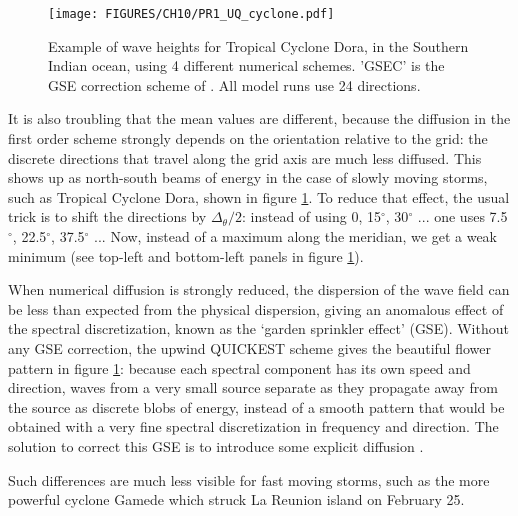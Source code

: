 \begin{figure}[htb]
\centerline{\texttt{[image: FIGURES/CH10/PR1\_UQ\_cyclone.pdf]}}
\caption{Example of wave heights for Tropical Cyclone Dora, in the Southern Indian ocean, using 4 different numerical schemes. 
'GSEC' is the GSE correction scheme of 
\cite{Tolman2002a}. All model runs use 24 directions. }
\label{fig:PR1_UQ_space}
\end{figure}
It is also troubling that the mean values are different, because the diffusion in the first order scheme strongly depends on the orientation relative to the 
grid: the discrete directions that travel along the grid axis are much less diffused. This shows up as north-south beams of energy in the case
of slowly moving storms, such as Tropical Cyclone Dora, shown in figure \ref{fig:PR1_UQ_space}. To reduce that effect, the usual trick is to shift 
the directions by $\Delta_\theta/2$: instead of using 0, 15$^\circ$, 30$^\circ$ ... one uses 7.5$^\circ$, 22.5$^\circ$, 37.5$^\circ$ ... 
Now, instead of a maximum along the meridian, we get a weak minimum (see top-left and bottom-left 
panels in figure \ref{fig:PR1_UQ_space}). 


When numerical diffusion is strongly reduced, the dispersion of the wave field can be less than expected from the physical dispersion, giving 
an anomalous effect of the spectral discretization, known as 
the `garden sprinkler effect' (GSE). Without any GSE correction, the upwind QUICKEST scheme gives the beautiful flower pattern in 
figure \ref{fig:PR1_UQ_space}: because each spectral component has its own speed and direction, waves from a very small source separate as they 
propagate away from the source as discrete blobs of energy, instead of a smooth pattern that would be obtained with a very fine spectral 
discretization in frequency and direction. The solution to correct this GSE is to introduce some explicit diffusion \citep{Tolman2002a}.

Such differences are much less visible for fast moving storms, such as the more powerful cyclone Gamede which struck La Reunion island 
on February 25. 


